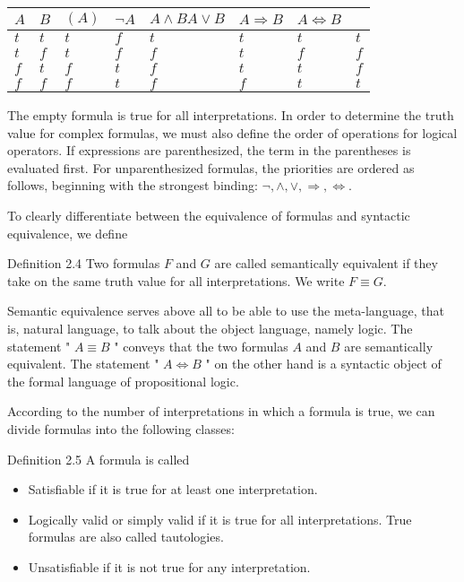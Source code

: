 \documentclass[10pt]{article}
\begin{document}
\begin{center}
\begin{tabular}{llllllll}
\hline
$A$ & $B$ & $(A)$ & $\neg A$ & $A \wedge B A \vee B$ & $A \Rightarrow B$ & $A \Leftrightarrow B$ &  \\
\hline
$t$ & $t$ & $t$ & $f$ & $t$ & $t$ & $t$ & $t$ \\
\hline
$t$ & $f$ & $t$ & $f$ & $f$ & $t$ & $f$ & $f$ \\
\hline
$f$ & $t$ & $f$ & $t$ & $f$ & $t$ & $t$ & $f$ \\
\hline
$f$ & $f$ & $f$ & $t$ & $f$ & $f$ & $t$ & $t$ \\
\hline
\end{tabular}
\end{center}

The empty formula is true for all interpretations. In order to determine the truth value for complex formulas, we must also define the order of operations for logical operators. If expressions are parenthesized, the term in the parentheses is evaluated first. For unparenthesized formulas, the priorities are ordered as follows, beginning with the strongest binding: $\neg, \wedge, \vee, \Rightarrow, \Leftrightarrow$.

To clearly differentiate between the equivalence of formulas and syntactic equivalence, we define

Definition 2.4 Two formulas $F$ and $G$ are called semantically equivalent if they take on the same truth value for all interpretations. We write $F \equiv G$.

Semantic equivalence serves above all to be able to use the meta-language, that is, natural language, to talk about the object language, namely logic. The statement " $A \equiv B$ " conveys that the two formulas $A$ and $B$ are semantically equivalent. The statement " $A \Leftrightarrow B$ " on the other hand is a syntactic object of the formal language of propositional logic.

According to the number of interpretations in which a formula is true, we can divide formulas into the following classes:

Definition 2.5 A formula is called

\begin{itemize}
  \item Satisfiable if it is true for at least one interpretation.
  \item Logically valid or simply valid if it is true for all interpretations. True formulas are also called tautologies.
  \item Unsatisfiable if it is not true for any interpretation.
\end{itemize}
\end{document}
